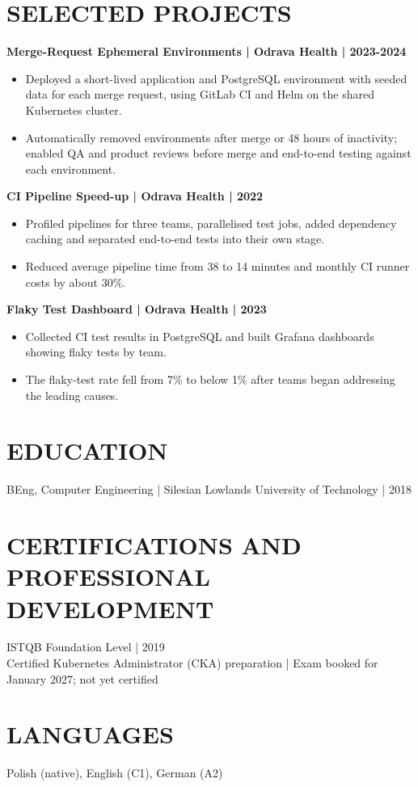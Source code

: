 \documentclass[11pt,a4paper]{article}
\begin{document}
\section*{SELECTED PROJECTS}
\textbf{Merge-Request Ephemeral Environments | Odrava Health | 2023-2024}
\begin{itemize}
\item Deployed a short-lived application and PostgreSQL environment with seeded data for each merge request, using GitLab CI and Helm on the shared Kubernetes cluster.
\item Automatically removed environments after merge or 48 hours of inactivity; enabled QA and product reviews before merge and end-to-end testing against each environment.
\end{itemize}
\textbf{CI Pipeline Speed-up | Odrava Health | 2022}
\begin{itemize}
\item Profiled pipelines for three teams, parallelised test jobs, added dependency caching and separated end-to-end tests into their own stage.
\item Reduced average pipeline time from 38 to 14 minutes and monthly CI runner costs by about 30\%.
\end{itemize}
\textbf{Flaky Test Dashboard | Odrava Health | 2023}
\begin{itemize}
\item Collected CI test results in PostgreSQL and built Grafana dashboards showing flaky tests by team.
\item The flaky-test rate fell from 7\% to below 1\% after teams began addressing the leading causes.
\end{itemize}
\section*{EDUCATION}
BEng, Computer Engineering | Silesian Lowlands University of Technology | 2018
\section*{CERTIFICATIONS AND PROFESSIONAL DEVELOPMENT}
ISTQB Foundation Level | 2019\\
Certified Kubernetes Administrator (CKA) preparation | Exam booked for January 2027; not yet certified
\section*{LANGUAGES}
Polish (native), English (C1), German (A2)
\end{document}
